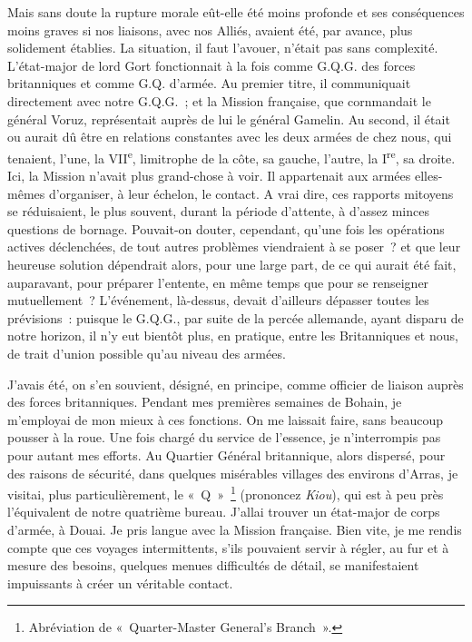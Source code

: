 \documentclass[french,twoside]{book} %
\begin{document}
Mais sans doute la rupture morale eût-elle été moins profonde et ses conséquences moins graves si nos liaisons, avec nos Alliés, avaient été, par avance, plus solidement établies. La situation, il faut l’avouer, n’était pas sans complexité. L’état-major de lord Gort fonctionnait à la fois comme G.Q.G. des forces britanniques et comme G.Q. d’armée. Au premier titre, il communiquait directement avec notre G.Q.G. ; et la Mission française, que cornmandait le général Voruz, représentait auprès de lui le général Gamelin. Au second, il était ou aurait dû être en relations constantes avec les deux armées de chez nous, qui tenaient, l’une, la VII\textsuperscript{e}, limitrophe de la côte, sa gauche, l’autre, la I\textsuperscript{re}, sa droite. Ici, la Mission n’avait plus grand-chose à voir. Il appartenait aux armées elles-mêmes d’organiser, à leur échelon, le contact. A vrai dire, ces rapports mitoyens se réduisaient, le plus souvent, durant la période d’attente, à d’assez minces questions de   bornage. Pouvait-on douter, cependant, qu’une fois les opérations actives déclenchées, de tout autres problèmes viendraient à se poser ? et que leur heureuse solution dépendrait alors, pour une large part, de ce qui aurait été fait, auparavant, pour préparer l’entente, en même temps que pour se renseigner mutuellement ? L’événement, là-dessus, devait d’ailleurs dépasser toutes les prévisions : puisque le G.Q.G., par suite de la percée allemande, ayant disparu de notre horizon, il n’y eut bientôt plus, en pratique, entre les Britanniques et nous, de trait d’union possible qu’au niveau des armées.\par
J’avais été, on s’en souvient, désigné, en principe, comme officier de liaison auprès des forces britanniques. Pendant mes premières semaines de Bohain, je m’employai de mon mieux à ces fonctions. On me laissait faire, sans beaucoup pousser à la roue. Une fois chargé du service de l’essence, je n’interrompis pas pour autant mes efforts. Au Quartier Général britannique, alors dispersé, pour des raisons de sécurité, dans quelques misérables villages des environs d’Arras, je visitai, plus particulièrement, le « Q » \footnote{Abréviation de « Quarter-Master General’s Branch ».} (prononcez {\itshape Kiou}), qui est à peu près l’équivalent de notre quatrième bureau. J’allai trouver un état-major de corps d’armée, à Douai. Je pris langue avec la Mission française. Bien vite, je me rendis compte que ces voyages intermittents, s’ils pouvaient servir à régler, au fur et à mesure des besoins, quelques menues difficultés de détail, se manifestaient impuissants à créer un véritable contact.\par
\end{document}
